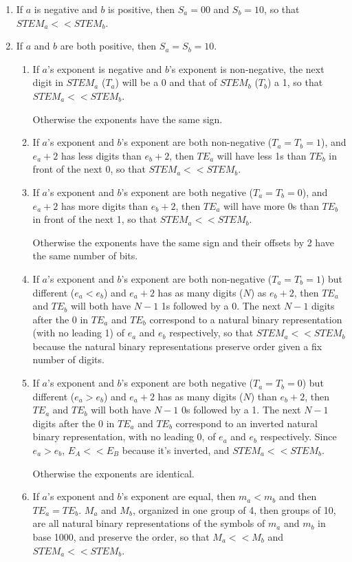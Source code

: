\documentclass{acm_proc_article-sp}
\begin{document}
\begin{enumerate}
\item If $a$ is negative and $b$ is positive, then $S_a=00$ and $S_b=10$, so that $STEM_a << STEM_b$.
\item If $a$ and $b$ are both positive, then $S_a=S_b=10$.
\begin{enumerate}
  \item If $a$'s exponent is negative and $b$'s exponent is non-negative, the next digit in $STEM_a$ ($T_a$) will be a 0 and that of $STEM_b$ ($T_b$) a 1, so that $STEM_a<< STEM_b$.

  Otherwise the exponents have the same sign.
  \item If $a$'s exponent and $b$'s exponent are both non-negative ($T_a=T_b=1$), and $e_a+2$ has less digits than $e_b+2$, then $TE_a$ will have less 1s than $TE_b$ in front of the next 0, so that $STEM_a << STEM_b$.
  \item If $a$'s exponent and $b$'s exponent are both negative ($T_a=T_b=0$), and $e_a+2$ has more digits than $e_b+2$, then $TE_a$ will have more 0s than $TE_b$ in front of the next 1, so that $STEM_a << STEM_b$.

  Otherwise the exponents have the same sign and their offsets by 2 have the same number of bits.
  \item If $a$'s exponent and $b$'s exponent are both non-negative ($T_a=T_b=1$) but different ($e_a < e_b$) and $e_a+2$ has as many digits ($N$) as $e_b+2$, then $TE_a$ and $TE_b$ will both have $N-1$ 1s followed by a 0. The next $N-1$ digits after the 0 in $TE_a$ and $TE_b$ correspond to a natural binary representation (with no leading 1) of $e_a$ and $e_b$ respectively, so that $STEM_a << STEM_b$ because the natural binary representations preserve order given a fix number of digits.
  \item If $a$'s exponent and $b$'s exponent are both negative ($T_a=T_b=0$) but different ($e_a > e_b$) and $e_a+2$ has as many digits ($N$) than $e_b+2$, then $TE_a$ and $TE_b$ will both have $N-1$ 0s followed by a 1. The next $N-1$ digits after the 0 in $TE_a$ and $TE_b$ correspond to an inverted natural binary representation, with no leading 0, of $e_a$ and $e_b$ respectively. Since $e_a > e_b$, $E_A << E_B$ because it's inverted, and $STEM_a << STEM_b$.

  Otherwise the exponents are identical.
  \item If $a$'s exponent and $b$'s exponent are equal, then $m_a < m_b$ and then $TE_a=TE_b$. $M_a$ and $M_b$, organized in one group of 4, then groups of 10, are all natural binary representations of the symbols of $m_a$ and $m_b$ in base 1000, and preserve the order, so that $M_a<<M_b$ and $STEM_a << STEM_b$.
  \end{enumerate}



\end{enumerate}
\end{document}

